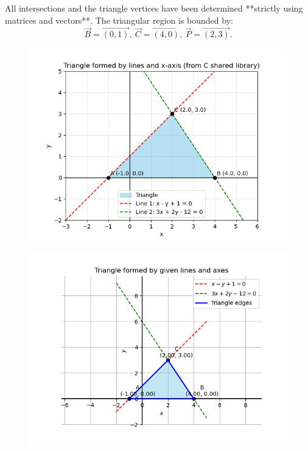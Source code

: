 \documentclass[journal]{IEEEtran}
\begin{document}
All intersections and the triangle vertices have been determined **strictly using matrices and vectors**. The triangular region is bounded by:
\[
\boxed{\vec{B} = \vec{(0,1)},\ \vec{C} = \vec{(4,0)},\ \vec{P} = \vec{(2,3)}}.
\]
\begin{figure}[h]
    \centering
    \includegraphics[width=0.9\columnwidth]{figs/fig81.png}
    \caption{}
    \label{fig:placeholder}
\end{figure}
\begin{figure}
    \centering
    \includegraphics[width=0.9\columnwidth]{figs/fig82.png}
    \caption{}
    \label{fig:placeholder}
\end{figure}
\end{document}
